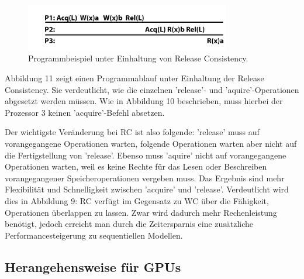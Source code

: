 \documentclass[final,bibliography=totocnumbered]{include/sikseminar}
\begin{document}
\begin{figure}[htbp] %
  \centering
  \includegraphics[width=0.8\textwidth]{figures/rellit}
  \caption{Programmbeispiel unter Einhaltung von Release Consistency. \cite{}}
  \label{Fig:rc}
\end{figure}

Abbildung 11 zeigt einen Programmablauf unter Einhaltung der Release Consistency. Sie verdeutlicht, wie die einzelnen 'release'- und 'aquire'-Operationen abgesetzt werden müssen. Wie in Abbildung 10 beschrieben, muss hierbei der Prozessor 3 keinen 'acquire'-Befehl absetzen.

Der wichtigste Veränderung bei RC ist also folgende: 'release' muss auf vorangegangene Operationen warten, folgende Operationen warten aber nicht auf die Fertigstellung von 'release'. Ebenso muss 'aquire' nicht auf vorangegangene Operationen warten, weil es keine Rechte für das Lesen oder Beschreiben vorangegangener Speicheroperationen vergeben muss.
Das Ergebnis sind mehr Flexibilität und Schnelligkeit zwischen 'acquire' und 'release'.
Verdeutlicht wird dies in Abbildung 9: %
RC verfügt im Gegensatz zu WC über die Fähigkeit, Operationen überlappen zu lassen.
Zwar wird dadurch mehr Rechenleistung benötigt, jedoch erreicht man durch die Zeitersparnis eine zusätzliche Performancesteigerung zu sequentiellen Modellen.








	\subsection{Herangehensweise für GPUs}
\end{document}
